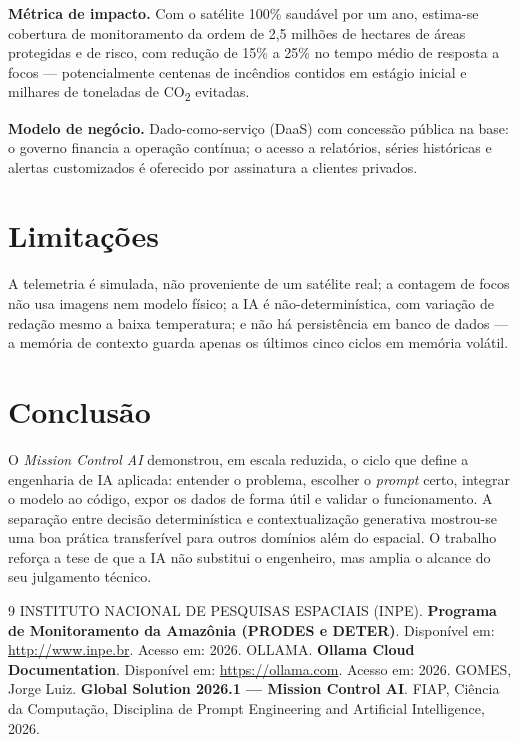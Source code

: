 \documentclass[12pt,a4paper]{article}
\begin{document}
\textbf{Métrica de impacto.} Com o satélite 100\% saudável por um ano, estima-se cobertura de monitoramento da ordem de 2,5 milhões de hectares de áreas protegidas e de risco, com redução de 15\% a 25\% no tempo médio de resposta a focos --- potencialmente centenas de incêndios contidos em estágio inicial e milhares de toneladas de CO\textsubscript{2} evitadas.

\textbf{Modelo de negócio.} Dado-como-serviço (DaaS) com concessão pública na base: o governo financia a operação contínua; o acesso a relatórios, séries históricas e alertas customizados é oferecido por assinatura a clientes privados.

\section{Limitações}

A telemetria é simulada, não proveniente de um satélite real; a contagem de focos não usa imagens nem modelo físico; a IA é não-determinística, com variação de redação mesmo a baixa temperatura; e não há persistência em banco de dados --- a memória de contexto guarda apenas os últimos cinco ciclos em memória volátil.

\section{Conclusão}

O \textit{Mission Control AI} demonstrou, em escala reduzida, o ciclo que define a engenharia de IA aplicada: entender o problema, escolher o \textit{prompt} certo, integrar o modelo ao código, expor os dados de forma útil e validar o funcionamento. A separação entre decisão determinística e contextualização generativa mostrou-se uma boa prática transferível para outros domínios além do espacial. O trabalho reforça a tese de que a IA não substitui o engenheiro, mas amplia o alcance do seu julgamento técnico.

\renewcommand{\refname}{REFERÊNCIAS}
\begin{thebibliography}{9}
 INSTITUTO NACIONAL DE PESQUISAS ESPACIAIS (INPE). \textbf{Programa de Monitoramento da Amazônia (PRODES e DETER)}. Disponível em: \url{http://www.inpe.br}. Acesso em: 2026.
 OLLAMA. \textbf{Ollama Cloud Documentation}. Disponível em: \url{https://ollama.com}. Acesso em: 2026.
 GOMES, Jorge Luiz. \textbf{Global Solution 2026.1 --- Mission Control AI}. FIAP, Ciência da Computação, Disciplina de Prompt Engineering and Artificial Intelligence, 2026.
\end{thebibliography}
\end{document}
